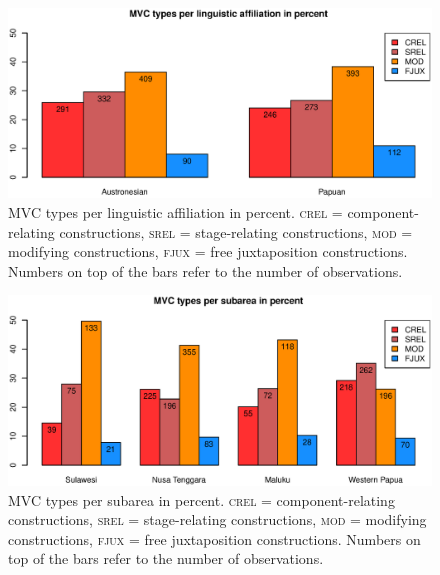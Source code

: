 \begin{figure}
\includegraphics[width=\columnwidth]{figures/Type_Family.eps}
\caption[MVC types per linguistic affiliation in percent]{MVC types per linguistic affiliation in percent. \textsc{crel} = component-relating constructions, \textsc{srel} = stage-relating constructions, \textsc{mod} = modifying constructions, \textsc{fjux} = free juxtaposition constructions. Numbers on top of the bars refer to the number of observations.}\label{fig:type-family}
\end{figure}
\begin{figure}
\includegraphics[width=\columnwidth]{figures/Type_Group.eps}
\caption[MVC types per subarea in percent]{MVC types per subarea in percent. \textsc{crel} = component-relating constructions, \textsc{srel} = stage-relating constructions, \textsc{mod} = modifying constructions, \textsc{fjux} = free juxtaposition constructions. Numbers on top of the bars refer to the number of observations.}\label{fig:type-group6}
\end{figure}

